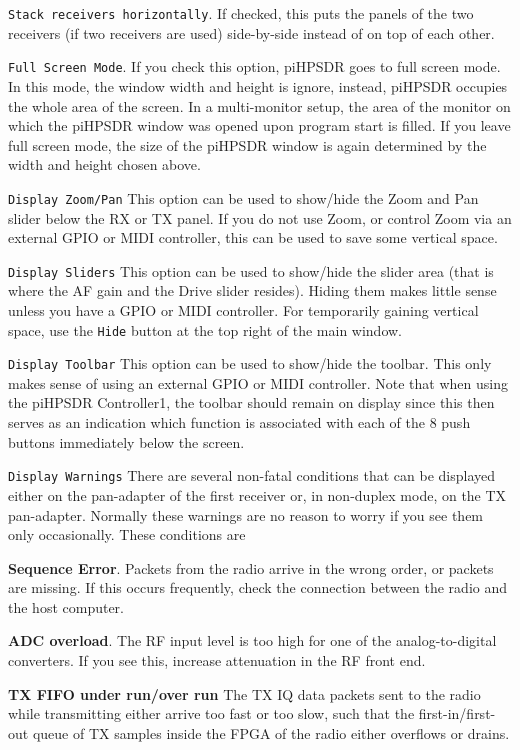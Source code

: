 \documentclass[12pt]{book}
\def\rett#1{\texttt{\color{red}#1}}
\def\pH{pi\-HPSDR\xspace}
\begin{document}
\rett{Stack receivers horizontally}. If checked, this puts the panels
of the two receivers (if two receivers are used) side-by-side instead of on top
of each other.


\rett{Full Screen Mode}. If you check this option, \pH goes to full screen mode.
In this mode, the window width and height is ignore, instead, \pH occupies
the whole area of the screen. In a multi-monitor setup, the area of the monitor
on which the \pH window was opened upon program start is filled.
If you leave full screen mode, the size of the \pH window is again
determined by the width and height chosen above.

\rett{Display Zoom/Pan} This option can be used to show/hide the Zoom and
Pan slider below the RX or TX panel. If you do not use Zoom, or control
Zoom via an external GPIO or MIDI controller, this can be used to save
some vertical space.

\rett{Display Sliders} This option can be used to show/hide the slider area
(that is where the AF gain and the Drive slider resides).
Hiding them makes little sense unless you
have a GPIO or MIDI controller. For temporarily gaining vertical space,
use the \rett{Hide} button at the top right of the main window.

\rett{Display Toolbar} This option can be used to show/hide the toolbar. This
only makes sense of using an external GPIO or MIDI controller. Note that
when using the \pH Controller1, the toolbar should remain on display since
this then serves as an indication which function is associated with each of
the 8 push buttons immediately below the screen.

\rett{Display Warnings} There are several non-fatal conditions that can
be displayed either on the pan-adapter of the first receiver or, in non-duplex
mode, on the TX pan-adapter. Normally these warnings are no reason to worry
if you see them  only occasionally. These conditions are

\textbf{Sequence Error}. Packets from the radio arrive in the wrong order, or packets
are missing. If this occurs frequently, check the connection between the radio and
the host computer.

\textbf{ADC overload}. The RF input level is too high for one of the analog-to-digital
converters. If you see this, increase attenuation in the RF front end.

\textbf{TX FIFO under run/over run} The TX IQ data packets sent to the radio while transmitting
either arrive too fast or too slow, such that the first-in/first-out queue of TX samples
inside the FPGA of the radio either overflows or drains.
\end{document}

